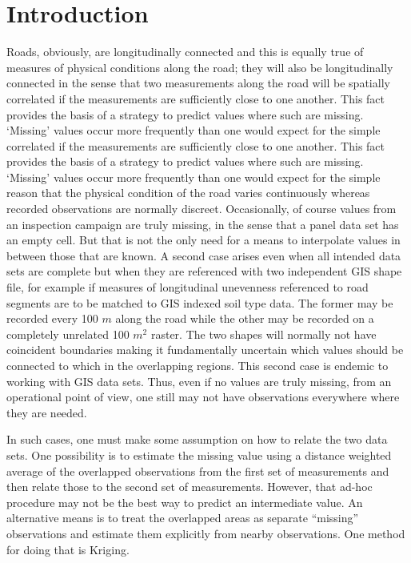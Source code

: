 \documentclass[Journal]{ascelike}
\begin{document}
\section{Introduction} \label{introduction}
Roads, obviously, are longitudinally connected and this is equally true of measures of physical conditions along the 
road; they will also be longitudinally connected in the sense that two measurements along the road will be spatially 
correlated if the measurements are sufficiently close to one another. This fact provides the basis of a strategy to 
predict values where such are missing. ‘Missing’ values occur more frequently than one would expect for the simple 
correlated if the measurements are sufficiently close to one another. This fact provides the basis of a strategy to predict values where such are missing. ‘Missing’ values occur more frequently than one would expect for the simple reason that the physical condition of the road varies continuously whereas recorded observations are normally discreet. Occasionally, of course values from an inspection campaign are truly missing, in the sense that a panel data set has an empty cell. But that is not the only need for a means to interpolate values in between those that are known. A second case arises even when all intended data sets are complete but when they are referenced with two independent GIS shape file, for example if measures of longitudinal unevenness referenced to road segments are to be matched to GIS indexed soil type data. The former may be recorded every 100 $m$ along the road while the other may be recorded on a completely unrelated 100 $m^2$ raster. The two shapes will normally not have coincident boundaries making it fundamentally uncertain which values should be connected to which in the overlapping regions. This second case is endemic to working with GIS data sets. Thus, even if no values are truly missing, from an operational point of view, one still may not have observations everywhere where they are needed. 

In such cases, one must make some assumption on how to relate the two data sets. One possibility is to estimate the missing value using a distance weighted average of the overlapped observations from the first set of measurements and then relate those to the second set of measurements. However, that ad-hoc procedure may not be the best way to predict an intermediate value. An alternative means is to treat the overlapped areas as separate ``missing'' observations and estimate them explicitly from nearby observations. One method for doing that is Kriging. 
\end{document}

